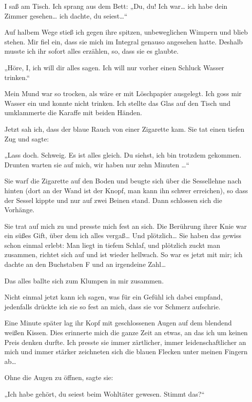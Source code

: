 I saß am Tisch. Ich sprang aus dem Bett: „Du, du! Ich war\ldots{} ich
habe dein Zimmer gesehen\ldots{} ich dachte, du seiest\ldots{}“

Auf halbem Wege stieß ich gegen ihre spitzen, unbeweglichen Wimpern
und blieb stehen. Mir fiel ein, dass sie mich im Integral genauso
angesehen hatte. Deshalb musste ich ihr sofort alles erzählen, so,
dass sie es glaubte.

„Höre, I, ich will dir alles sagen. Ich will
nur vorher einen Schluck Wasser trinken.“

Mein Mund war so trocken, als wäre er mit Löschpapier ausgelegt.
Ich goss mir Wasser ein und konnte nicht trinken. Ich stellte das
Glas auf den Tisch und umklammerte die Karaffe mit beiden Händen.

Jetzt sah ich, dass der blaue Rauch von einer Zigarette kam. Sie
tat einen tiefen Zug und sagte:

„Lass doch. Schweig. Es ist alles
gleich. Du siehst, ich bin trotzdem gekommen. Drunten warten sie
auf mich, wir haben nur zehn Minuten \ldots{}“

Sie warf die Zigarette auf den Boden und beugte sich über die
Sessellehne nach hinten (dort an der Wand ist der Knopf, man kann
ihn schwer erreichen), so dass der Sessel kippte und nur auf zwei
Beinen stand. Dann schlossen sich die Vorhänge.

Sie trat auf mich zu und presste mich fest an sich. Die Berührung
ihrer Knie war ein süßes Gift, über dem ich alles vergaß\ldots{} Und
plötzlich\ldots{} Sie haben das gewiss schon einmal erlebt: Man liegt in
tiefem Schlaf, und plötzlich zuckt man zusammen, richtet sich auf
und ist wieder hellwach. So war es jetzt mit mir; ich dachte an den
Buchstaben F und an irgendeine Zahl\ldots{}

Das alles ballte sich zum
Klumpen in mir zusammen.

Nicht einmal jetzt kann ich sagen, was für ein Gefühl ich dabei
empfand, jedenfalls drückte ich sie so fest an mich, dass sie vor
Schmerz aufschrie.

Eine Minute später lag ihr Kopf mit geschlossenen Augen auf dem
blendend weißen Kissen. Dies erinnerte mich die ganze Zeit an
etwas, an das ich um keinen Preis denken durfte. Ich presste sie
immer zärtlicher, immer leidenschaftlicher an mich und immer
stärker zeichneten sich die blauen Flecken unter meinen Fingern
ab\ldots{}

Ohne die Augen zu öffnen, sagte sie:

„Ich habe gehört, du seiest beim Wohltäter gewesen. Stimmt das?“

